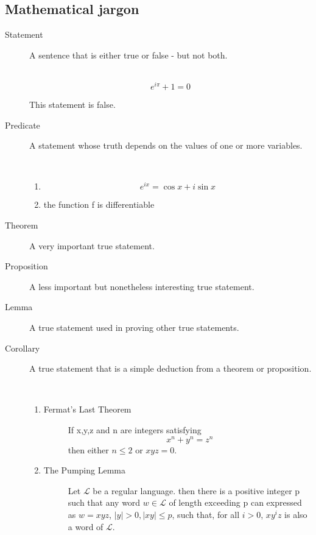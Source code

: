 \documentclass[a4paper]{article}
\begin{document}
\subsection{Mathematical jargon}
\begin{description}
\item[Statement] A sentence that is either true or false - but not both.

\begin{eg}[1]\ 
$$e^{i\pi}+1=0$$
\end{eg}
\begin{eg}[Wrong]
This statement is false.
\end{eg}

\item[Predicate] A statement whose truth depends on the values of one or more variables.

\begin{eg}[2]\ 
\begin{enumerate}
\item $$e^{ix}=\cos x + i\sin x$$
\item the function f is differentiable
\end{enumerate}
\end{eg}

\item[Theorem] A very important true statement.
\item[Proposition] A less important but nonetheless interesting true statement.
\item[Lemma] A true statement used in proving other true statements.
\item[Corollary] A true statement that is a simple deduction from a theorem or proposition.

\begin{eg}[3]\ 
\begin{enumerate}

\item 
\begin{description}
\item[Fermat's Last Theorem] If x,y,z and n are integers satisfying 
$$x^n+y^n=z^n$$
then either $n\leq 2$ or $xyz=0$.
\end{description}

\item \begin{description}
\item[The Pumping Lemma] Let $\mathcal{L}$ be a regular language. then there is a positive integer p such that any word $w\in \mathcal{L}$ of length exceeding p can expressed as $w=xyz$, $|y|>0,|xy|\leq p$, such that, for all $i>0$, $xy^iz$ is also a word of $\mathcal{L}$.
\end{description} 
\end{enumerate}
\end{eg}


\end{description}
\end{document}
